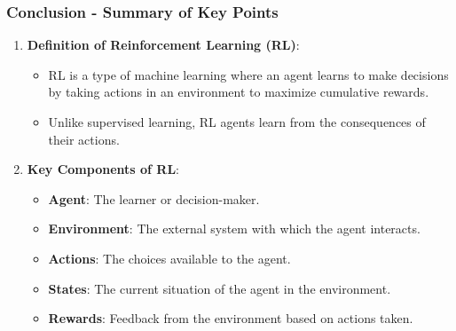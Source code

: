 \documentclass[aspectratio=169]{beamer}
\begin{document}
\begin{frame}[fragile]
    \frametitle{Conclusion - Summary of Key Points}
    \begin{enumerate}
        \item \textbf{Definition of Reinforcement Learning (RL)}:
        \begin{itemize}
            \item RL is a type of machine learning where an agent learns to make decisions by taking actions in an environment to maximize cumulative rewards.
            \item Unlike supervised learning, RL agents learn from the consequences of their actions.
        \end{itemize}
        
        \item \textbf{Key Components of RL}:
        \begin{itemize}
            \item \textbf{Agent}: The learner or decision-maker.
            \item \textbf{Environment}: The external system with which the agent interacts.
            \item \textbf{Actions}: The choices available to the agent.
            \item \textbf{States}: The current situation of the agent in the environment.
            \item \textbf{Rewards}: Feedback from the environment based on actions taken.
        \end{itemize}
    \end{enumerate}
\end{frame}
\end{document}
